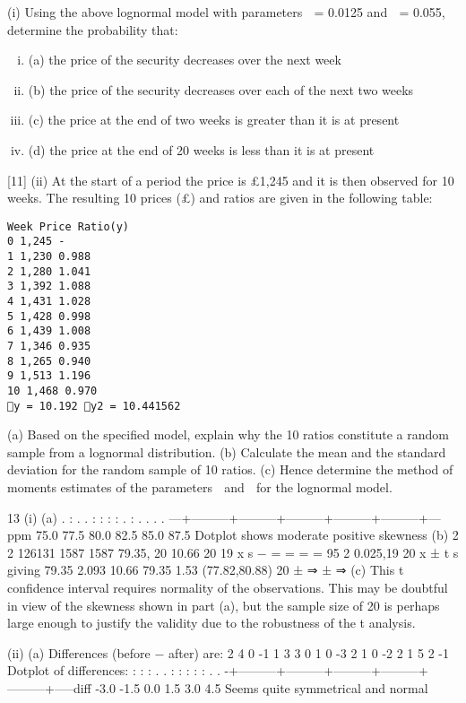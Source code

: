 \documentclass[a4paper,12pt]{article}
\begin{document}
\begin{enumerate}
(i) Using the above lognormal model with parameters  = 0.0125 and  = 0.055,
determine the probability that:
\begin{enumerate}[(i)]
    \item (a) the price of the security decreases over the next week
\item (b) the price of the security decreases over each of the next two weeks
\item (c) the price at the end of two weeks is greater than it is at present
\item (d) the price at the end of 20 weeks is less than it is at present
\end{enumerate}

[11]
(ii) At the start of a period the price is £1,245 and it is then observed for 10 weeks.
The resulting 10 prices (£) and ratios are given in the following table:
\begin{verbatim}
Week Price Ratio(y)
0 1,245 -
1 1,230 0.988
2 1,280 1.041
3 1,392 1.088
4 1,431 1.028
5 1,428 0.998
6 1,439 1.008
7 1,346 0.935
8 1,265 0.940
9 1,513 1.196
10 1,468 0.970
y = 10.192 y2 = 10.441562    
\end{verbatim}

(a) Based on the specified model, explain why the 10 ratios constitute a
random sample from a lognormal distribution.
(b) Calculate the mean and the standard deviation for the random sample
of 10 ratios.
(c) Hence determine the method of moments estimates of the parameters 
and  for the lognormal model. 
\end{enumerate}
\newpage

13 (i) (a)
. : .
. : : : : . : . . . .
---+---------+---------+---------+---------+---------+---ppm
75.0 77.5 80.0 82.5 85.0 87.5
Dotplot shows moderate positive skewness
(b)
2
2
126131 1587 1587 79.35, 20 10.66
20 19
x s
−
= = = =
95%
2
0.025,19 20
x ± t s
giving 79.35 2.093 10.66 79.35 1.53 (77.82,80.88)
20
± ⇒ ± ⇒
(c) This t confidence interval requires normality of the observations.
This may be doubtful in view of the skewness shown in part (a), but
the sample size of 20 is perhaps large enough to justify the validity due
to the robustness of the t analysis.


(ii) (a) Differences (before − after) are:
2 4 0 -1 1 3 3 0 1 0
-3 2 1 0 -2 2 1 5 2 -1
Dotplot of differences:
: : :
. . : : : : : . .
-+---------+---------+---------+---------+---------+-----diff
-3.0 -1.5 0.0 1.5 3.0 4.5
Seems quite symmetrical and normal
\end{document}
